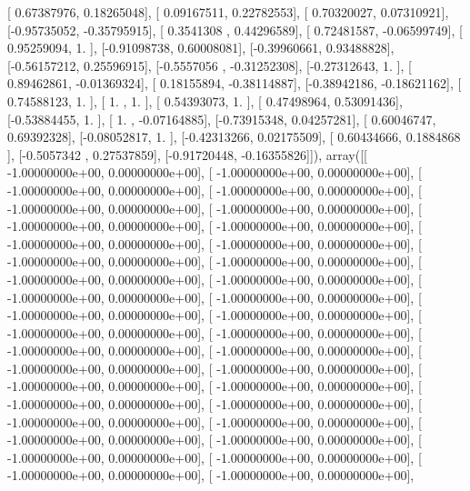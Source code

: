 \documentclass{article}
\begin{document}
       [ 0.67387976,  0.18265048],
       [ 0.09167511,  0.22782553],
       [ 0.70320027,  0.07310921],
       [-0.95735052, -0.35795915],
       [ 0.3541308 ,  0.44296589],
       [ 0.72481587, -0.06599749],
       [ 0.95259094,  1.        ],
       [-0.91098738,  0.60008081],
       [-0.39960661,  0.93488828],
       [-0.56157212,  0.25596915],
       [-0.5557056 , -0.31252308],
       [-0.27312643,  1.        ],
       [ 0.89462861, -0.01369324],
       [ 0.18155894, -0.38114887],
       [-0.38942186, -0.18621162],
       [ 0.74588123,  1.        ],
       [ 1.        ,  1.        ],
       [ 0.54393073,  1.        ],
       [ 0.47498964,  0.53091436],
       [-0.53884455,  1.        ],
       [ 1.        , -0.07164885],
       [-0.73915348,  0.04257281],
       [ 0.60046747,  0.69392328],
       [-0.08052817,  1.        ],
       [-0.42313266,  0.02175509],
       [ 0.60434666,  0.1884868 ],
       [-0.5057342 ,  0.27537859],
       [-0.91720448, -0.16355826]]), array([[ -1.00000000e+00,   0.00000000e+00],
       [ -1.00000000e+00,   0.00000000e+00],
       [ -1.00000000e+00,   0.00000000e+00],
       [ -1.00000000e+00,   0.00000000e+00],
       [ -1.00000000e+00,   0.00000000e+00],
       [ -1.00000000e+00,   0.00000000e+00],
       [ -1.00000000e+00,   0.00000000e+00],
       [ -1.00000000e+00,   0.00000000e+00],
       [ -1.00000000e+00,   0.00000000e+00],
       [ -1.00000000e+00,   0.00000000e+00],
       [ -1.00000000e+00,   0.00000000e+00],
       [ -1.00000000e+00,   0.00000000e+00],
       [ -1.00000000e+00,   0.00000000e+00],
       [ -1.00000000e+00,   0.00000000e+00],
       [ -1.00000000e+00,   0.00000000e+00],
       [ -1.00000000e+00,   0.00000000e+00],
       [ -1.00000000e+00,   0.00000000e+00],
       [ -1.00000000e+00,   0.00000000e+00],
       [ -1.00000000e+00,   0.00000000e+00],
       [ -1.00000000e+00,   0.00000000e+00],
       [ -1.00000000e+00,   0.00000000e+00],
       [ -1.00000000e+00,   0.00000000e+00],
       [ -1.00000000e+00,   0.00000000e+00],
       [ -1.00000000e+00,   0.00000000e+00],
       [ -1.00000000e+00,   0.00000000e+00],
       [ -1.00000000e+00,   0.00000000e+00],
       [ -1.00000000e+00,   0.00000000e+00],
       [ -1.00000000e+00,   0.00000000e+00],
       [ -1.00000000e+00,   0.00000000e+00],
       [ -1.00000000e+00,   0.00000000e+00],
       [ -1.00000000e+00,   0.00000000e+00],
       [ -1.00000000e+00,   0.00000000e+00],
       [ -1.00000000e+00,   0.00000000e+00],
       [ -1.00000000e+00,   0.00000000e+00],
       [ -1.00000000e+00,   0.00000000e+00],
       [ -1.00000000e+00,   0.00000000e+00],
\end{document}

